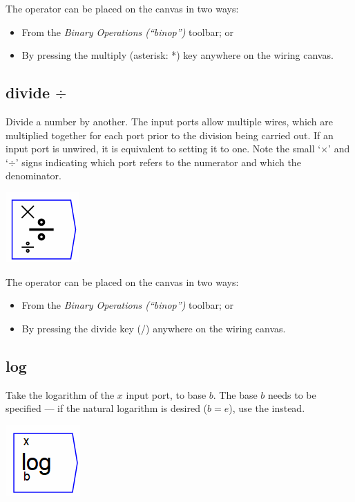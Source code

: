 The operator can be placed on the canvas in two ways:
\begin{itemize}
\item From the \emph{Binary Operations (``binop'')} toolbar; or 
\item By pressing the multiply (asterisk: {*}) key anywhere on the wiring
canvas. 
\end{itemize}

\subsection{divide $\div$}

\label{Operation:divide} Divide a number by another. The input ports
allow multiple wires, which are multiplied together for each port
prior to the division being carried out. If an input port is unwired,
it is equivalent to setting it to one. Note the small `$\times$'
and `$\div$' signs indicating which port refers to the numerator
and which the denominator.

\includegraphics{images/DivideKey}

The operator can be placed on the canvas in two ways:
\begin{itemize}
\item From the \emph{Binary Operations (``binop'')} toolbar; or 
\item By pressing the divide key (/) anywhere on the wiring canvas. 
\end{itemize}

\subsection{log}

\label{Operation:log} Take the logarithm of the $x$ input port,
to base $b$. The base $b$ needs to be specified --- if the natural
logarithm is desired ($b=e$), use the 
instead.

\includegraphics{images/LogKey}

